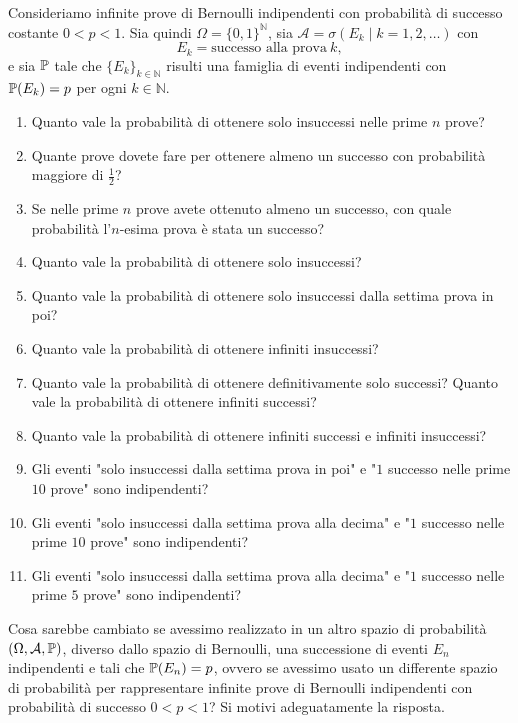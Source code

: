 
Consideriamo infinite prove di Bernoulli indipendenti con probabilità di successo costante $0< p< 1$. Sia quindi $\Omega =\{0,1\}^{\mathbb{N}}$, sia $\mathcal{A} =\sigma ( E_{k} \mid k=1,2,\dots )$ con
\begin{equation*}
	E_{k} =\text{successo alla prova} \ k,
\end{equation*}
e sia $\mathbb{P}$ tale che $\{E_{k}\}_{k\in \mathbb{N}}$ risulti una famiglia di eventi indipendenti con $\mathbb{P}( E_{k}) =p$ per ogni $k\in \mathbb{N}$.
\begin{enumerate}
	\item Quanto vale la probabilità di ottenere solo insuccessi nelle prime $n$ prove?
	\item Quante prove dovete fare per ottenere almeno un successo con probabilità maggiore di $\frac{1}{2}$?
	\item Se nelle prime $n$ prove avete ottenuto almeno un successo, con quale probabilità l'$n$-esima prova è stata un successo?
	\item Quanto vale la probabilità di ottenere solo insuccessi?
	\item Quanto vale la probabilità di ottenere solo insuccessi dalla settima prova in poi?
	\item Quanto vale la probabilità di ottenere infiniti insuccessi?
	\item Quanto vale la probabilità di ottenere definitivamente solo successi? Quanto vale la probabilità di ottenere infiniti successi?
	\item Quanto vale la probabilità di ottenere infiniti successi e infiniti insuccessi?
	\item Gli eventi "solo insuccessi dalla settima prova in poi" e "$1$ successo nelle prime $10$ prove" sono indipendenti?
	\item Gli eventi "solo insuccessi dalla settima prova alla decima" e "$1$ successo nelle prime $10$ prove" sono indipendenti?
	\item Gli eventi "solo insuccessi dalla settima prova alla decima" e "$1$ successo nelle prime $5$ prove" sono indipendenti?
\end{enumerate}
Cosa sarebbe cambiato se avessimo realizzato in un altro spazio di probabilità $( \Omega ,\mathcal{A} ,\mathbb{P})$, diverso dallo spazio di Bernoulli, una successione di eventi $E_{n}$ indipendenti e tali che $\mathbb{P}( E_{n}) =p$, ovvero se avessimo usato un differente spazio di probabilità per rappresentare infinite prove di Bernoulli indipendenti con probabilità di successo $0< p< 1$? Si motivi adeguatamente la risposta.

